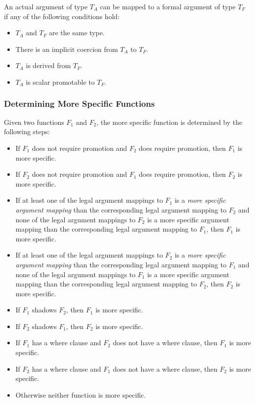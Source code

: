 An actual argument of type $T_A$ can be mapped to a formal argument of
type $T_F$ if any of the following conditions hold:
\begin{itemize}
\item $T_A$ and $T_F$ are the same type.
\item There is an implicit coercion from $T_A$ to $T_F$.
\item $T_A$ is derived from $T_F$.
\item $T_A$ is scalar promotable to $T_F$.
\end{itemize}

\subsubsection{Determining More Specific Functions}
\label{Determining_More_Specific_Functions}

Given two functions $F_1$ and $F_2$, the more specific function is
determined by the following steps:
\begin{itemize}
\item If $F_1$ does not require promotion and $F_2$ does require promotion, then $F_1$ is more specific.
\item If $F_2$ does not require promotion and $F_1$ does require promotion, then $F_2$ is more specific.
\item
If at least one of the legal argument mappings to $F_1$ is a {\em more
specific argument mapping} than the corresponding legal argument
mapping to $F_2$ and none of the legal argument mappings to $F_2$ is a
more specific argument mapping than the corresponding legal argument
mapping to $F_1$, then $F_1$ is more specific.
\item
If at least one of the legal argument mappings to $F_2$ is a {\em more
specific argument mapping} than the corresponding legal argument
mapping to $F_1$ and none of the legal argument mappings to $F_1$ is a
more specific argument mapping than the corresponding legal argument
mapping to $F_2$, then $F_2$ is more specific.
\item If $F_1$ shadows $F_2$, then $F_1$ is more specific.
\item If $F_2$ shadows $F_1$, then $F_2$ is more specific.
\item If $F_1$ has a where clause and $F_2$ does not have a where clause, then $F_1$ is more specific.
\item If $F_2$ has a where clause and $F_1$ does not have a where clause, then $F_2$ is more specific.
\item Otherwise neither function is more specific.
\end{itemize}

